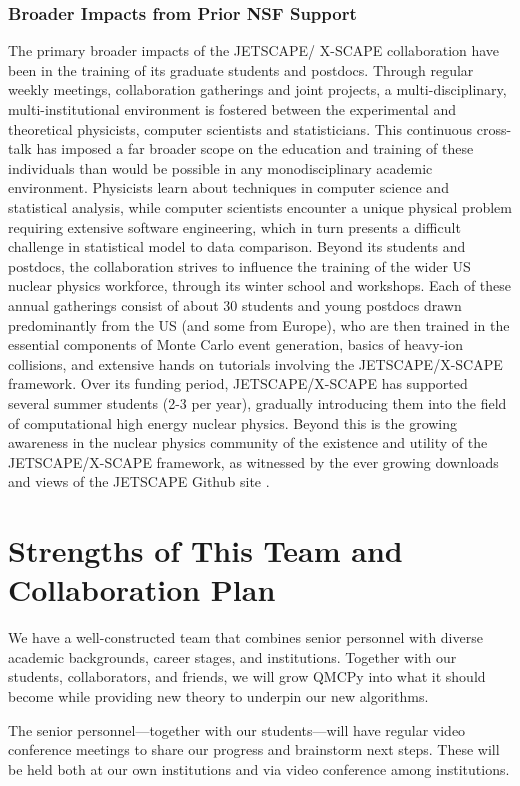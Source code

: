\documentclass[11pt]{NSFamsart}
\begin{document}
\subsubsection{Broader Impacts from Prior NSF Support}
The primary broader impacts of the JETSCAPE/ X-SCAPE collaboration have been in the training of its graduate students and postdocs. Through regular weekly meetings, collaboration gatherings and joint projects, a multi-disciplinary, multi-institutional environment is fostered between the experimental and theoretical physicists, computer scientists and statisticians. This continuous cross-talk has imposed a far broader scope on the education and training of these individuals than would be possible in any monodisciplinary academic environment. Physicists learn about techniques in computer science and statistical analysis, while computer scientists encounter a unique physical problem requiring extensive software engineering, which in turn presents a difficult challenge in statistical model to data comparison. Beyond its students and postdocs, the collaboration strives to influence the training of the wider US nuclear physics workforce, through its winter school and workshops. Each of these annual gatherings consist of about 30 students and young postdocs drawn predominantly from the US (and some from Europe), who are then trained in the essential components of Monte Carlo event generation, basics of heavy-ion collisions, and extensive hands on tutorials involving the JETSCAPE/X-SCAPE framework. Over its funding period, JETSCAPE/X-SCAPE has supported several summer students (2-3 per year), gradually introducing them into the field of computational high energy nuclear physics. Beyond this is the growing awareness in the nuclear physics community of the existence and utility of the JETSCAPE/X-SCAPE framework, as witnessed by the ever growing downloads and views of the JETSCAPE Github site \cite{jetscape}.

\section{Strengths of This Team and Collaboration Plan}
We have a well-constructed  team that combines senior personnel with diverse academic backgrounds, career stages, and institutions.  Together with our students, collaborators, and friends, we will grow QMCPy into what it should become while providing new theory to underpin our new algorithms.

The senior personnel---together with our students---will have regular video conference meetings to share our progress and brainstorm next steps. These will be held both at our own institutions and via video conference among institutions.
\end{document}
